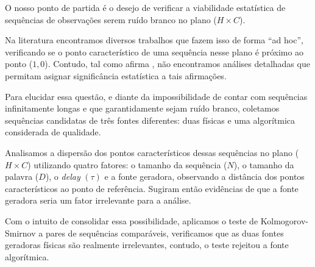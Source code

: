 \documentclass[tcc]{ic}
\begin{document}

\capa


\begin{resumo}
\noindent 


O nosso ponto de partida é o desejo de verificar a viabilidade estatística de sequências de observações serem ruído branco no plano ($H\times C$).

Na literatura encontramos diversos trabalhos que fazem isso de forma ``ad hoc'', verificando se o ponto característico de uma sequência nesse plano é próximo ao ponto ($1,0$). Contudo, tal como afirma \citet{NewPermutationEntropy}, não encontramos análises detalhadas que permitam asignar significância estatística a tais afirmações.

Para elucidar essa questão, e diante da impossibilidade de contar com sequências infinitamente longas e que garantidamente sejam ruído branco, coletamos sequências candidatas de três fontes diferentes: duas físicas e uma algorítmica considerada de qualidade.

Analisamos a dispersão dos pontos característicos dessas sequências no plano ($H\times C$) utilizando quatro fatores: o tamanho da sequência ($N$), o tamanho da palavra ($D$), o \textit{delay} $(\tau)$ e a fonte geradora, observando a distância dos pontos característicos ao ponto de referência. Sugiram então evidências de que a fonte geradora seria um fator irrelevante para a análise.


Com o intuito de consolidar essa possibilidade, aplicamos o teste de Kolmogorov-Smirnov a pares de sequências comparáveis, verificamos que as duas fontes geradoras físicas são realmente irrelevantes, contudo, o teste rejeitou a fonte algorítmica.


\end{resumo}
\end{document}
